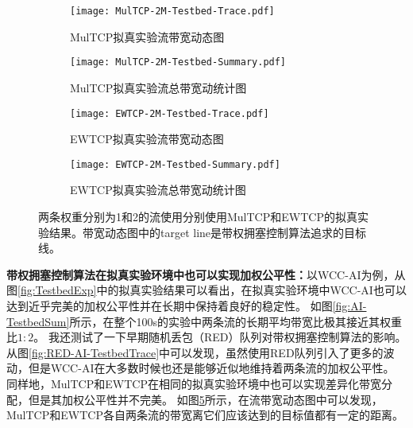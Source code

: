 \documentclass[winfonts]{njuthesis}
\begin{document}
\begin{figure}
  \begin{subfigure}{.5\textwidth}
    \centering
		\texttt{[image: MulTCP-2M-Testbed-Trace.pdf]}
    \label{fig:MulTCP-2M-TestbedTrace}
    \caption{MulTCP拟真实验流带宽动态图}
  \end{subfigure}
	\begin{subfigure}{.5\textwidth}
    \centering
		\texttt{[image: MulTCP-2M-Testbed-Summary.pdf]}
    \label{fig:MulTCP-2M-TestbedSum}
    \caption{MulTCP拟真实验流总带宽动统计图}
  \end{subfigure}
  \begin{subfigure}{.5\textwidth}
    \centering
		\texttt{[image: EWTCP-2M-Testbed-Trace.pdf]}
    \label{fig:EWTCP-2M-TestbedTrace}
    \caption{EWTCP拟真实验流带宽动态图}
  \end{subfigure}
	\begin{subfigure}{.5\textwidth}
    \centering
		\texttt{[image: EWTCP-2M-Testbed-Summary.pdf]}
    \label{fig:EWTCP-2M-TestbedSum}
    \caption{EWTCP拟真实验流总带宽动统计图}
  \end{subfigure}
  \label{fig:PreWorkTrace}
  \caption{两条权重分别为1和2的流使用分别使用MulTCP和EWTCP的拟真实验结果。带宽动态图中的target line是带权拥塞控制算法追求的目标线。}
\end{figure}

\textbf{带权拥塞控制算法在拟真实验环境中也可以实现加权公平性：}以WCC-AI为例，从图\ref{fig:TestbedExp}中的拟真实验结果可以看出，在拟真实验环境中WCC-AI也可以达到近乎完美的加权公平性并在长期中保持着良好的稳定性。
如图\ref{fig:AI-TestbedSum}所示，在整个100s的实验中两条流的长期平均带宽比极其接近其权重比$1:2$。
我还测试了一下早期随机丢包（RED）队列对带权拥塞控制算法的影响。
从图\ref{fig:RED-AI-TestbedTrace}中可以发现，虽然使用RED队列引入了更多的波动，但是WCC-AI在大多数时候也还是能够近似地维持着两条流的加权公平性。
同样地，MulTCP和EWTCP在相同的拟真实验环境中也可以实现差异化带宽分配，但是其加权公平性并不完美。
如图\ref{fig:PreWorkTrace}所示，在流带宽动态图中可以发现，MulTCP和EWTCP各自两条流的带宽离它们应该达到的目标值都有一定的距离。
\end{document}
